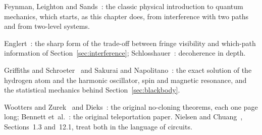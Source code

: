 \begin{furtherreading}
  \item Feynman, Leighton and Sands~\cite{feynman1965}: the classic physical introduction to quantum mechanics, which starts, as this chapter does, from interference with two paths and from two-level systems.
  \item Englert~\cite{englert1996}: the sharp form of the trade-off between fringe visibility and which-path information of Section~\ref{sec:interference}; Schlosshauer~\cite{schlosshauer2007}: decoherence in depth.
  \item Griffiths and Schroeter~\cite{griffiths2018} and Sakurai and Napolitano~\cite{sakurai2020}: the exact solution of the hydrogen atom and the harmonic oscillator, spin and magnetic resonance, and the statistical mechanics behind Section~\ref{sec:blackbody}.
  \item Wootters and Zurek~\cite{wootters1982} and Dieks~\cite{dieks1982}: the original no-cloning theorems, each one page long; Bennett et~al.~\cite{bennett1993}: the original teleportation paper. Nielsen and Chuang~\cite{nielsenchuang2010}, Sections~1.3 and~12.1, treat both in the language of circuits.
\end{furtherreading}
